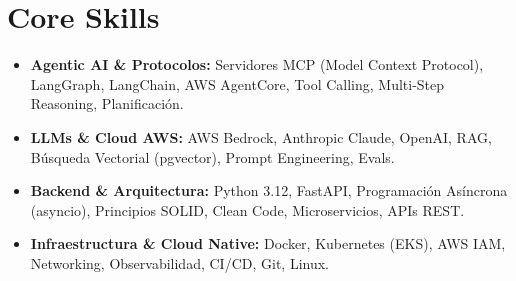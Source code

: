 \documentclass[a4paper,10pt]{article}
\begin{document}
\section{Core Skills}
\begin{itemize}
  \item \textbf{Agentic AI \& Protocolos:} Servidores MCP (Model Context Protocol), LangGraph, LangChain, AWS AgentCore, Tool Calling, Multi-Step Reasoning, Planificación.
  \item \textbf{LLMs \& Cloud AWS:} AWS Bedrock, Anthropic Claude, OpenAI, RAG, Búsqueda Vectorial (pgvector), Prompt Engineering, Evals.
  \item \textbf{Backend \& Arquitectura:} Python 3.12, FastAPI, Programación Asíncrona (asyncio), Principios SOLID, Clean Code, Microservicios, APIs REST.
  \item \textbf{Infraestructura \& Cloud Native:} Docker, Kubernetes (EKS), AWS IAM, Networking, Observabilidad, CI/CD, Git, Linux.
\end{itemize}
\end{document}

